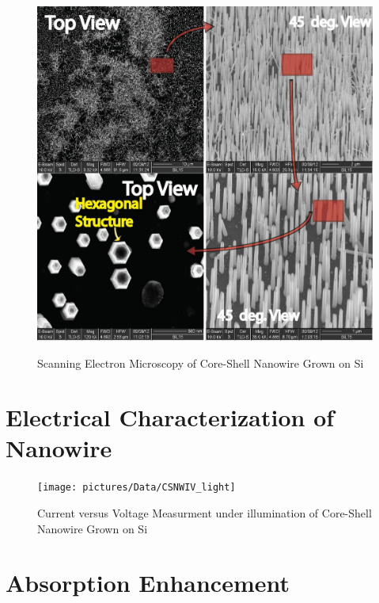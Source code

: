 \begin{figure}
  \caption{Scanning Electron Microscopy of Core-Shell Nanowire Grown on Si}
  \centering
  \includegraphics[width=\textwidth]{pictures/Data/SEMNW}
  \label{SEMNW}
\end{figure}

\section{Electrical Characterization of Nanowire}

\begin{figure}
  \caption{Current versus Voltage Measurment under illumination of Core-Shell Nanowire Grown on Si}
  \centering
  \texttt{[image: pictures/Data/CSNWIV\_light]}
  \label{CSNWIV_light}
\end{figure}

\section{Absorption Enhancement} \label{X-ray}

